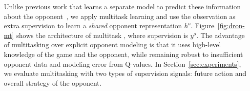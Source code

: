 Unlike previous work that learns a separate model to predict these
information about the
opponent~\cite{davidson99opponent,game-theory-opponent-modeling,schadd07opponentmodeling},
we apply multitask learning and use the observation as extra
supervision to learn a \emph{shared} opponent representation
$h^o$.  Figure~\ref{fig:dron-mt} shows the architecture of multitask
\dron{}, where supervision is $y^o$.
The advantage of multitasking over explicit opponent modeling is that
it uses high-level knowledge of the game and the opponent, while
remaining robust to insufficient opponent data and modeling error
from Q-values.  In Section~\ref{sec:experiments},
we evaluate multitasking \dron{} with two types of supervision
signals: future action and overall strategy of the opponent.

